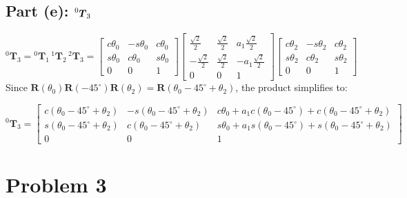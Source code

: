 \documentclass[11pt]{article}
\newcommand{\T}{\bm{T}}
\newcommand{\R}{\bm{R}}
\begin{document}
\subsection*{Part (e): $\prescript{0}{}{\T}_{3}$}
\[
    ^{0}\T_3 = {}^{0}\T_1\,{}^{1}\T_2\,{}^{2}\T_3 =
    \begin{bmatrix}c\theta_0 & -s\theta_0 & c\theta_0 \\ s\theta_0 & c\theta_0 & s\theta_0 \\ 0 & 0 & 1\end{bmatrix}
    \begin{bmatrix}\tfrac{\sqrt2}{2} & \tfrac{\sqrt2}{2} & a_1\tfrac{\sqrt2}{2} \\ -\tfrac{\sqrt2}{2} & \tfrac{\sqrt2}{2} & -a_1\tfrac{\sqrt2}{2} \\ 0 & 0 & 1\end{bmatrix}
    \begin{bmatrix}c\theta_2 & -s\theta_2 & c\theta_2 \\ s\theta_2 & c\theta_2 & s\theta_2 \\ 0 & 0 & 1\end{bmatrix}
\]
Since $\R(\theta_0)\R(-45^\circ)\R(\theta_2)=\R(\theta_0-45^\circ+\theta_2)$, the product simplifies to:
\begin{result}
\[
    ^{0}\T_3 = \begin{bmatrix}
        c(\theta_0-45^\circ+\theta_2) & -s(\theta_0-45^\circ+\theta_2) & c\theta_0 + a_1c(\theta_0-45^\circ) + c(\theta_0-45^\circ+\theta_2) \\
        s(\theta_0-45^\circ+\theta_2) & c(\theta_0-45^\circ+\theta_2) & s\theta_0 + a_1s(\theta_0-45^\circ) + s(\theta_0-45^\circ+\theta_2) \\
        0 & 0 & 1
    \end{bmatrix}
\]
\end{result}

\newpage
\section*{Problem 3}
\end{document}
